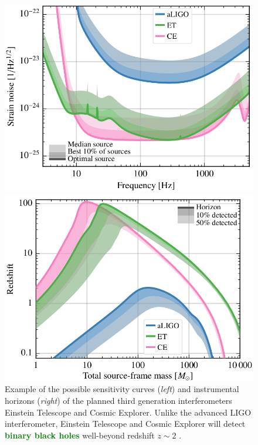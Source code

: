 \documentclass[a4paper,titlepage]{book}     	%
\newcommand{\erika}[1]{\textcolor{green}{\bf#1}}
\begin{document}
\begin{figure}[h]
	\begin{minipage}{.49\textwidth}
		\centering
		\includegraphics[width=\textwidth]{./images/ETsensitivity.png}
	\end{minipage}
	\hfill
	\begin{minipage}{.49\textwidth}
		\vspace{-2mm}
		\centering
		\includegraphics[width=1.02\textwidth]{./images/EThorizon.png}	
	\end{minipage}
	\caption{Example of the possible sensitivity curves (\emph{left}) and instrumental horizons (\emph{right}) of the planned third generation interferometers Einstein Telescope and Cosmic Explorer. Unlike the advanced LIGO interferometer, Einstein Telescope and Cosmic Explorer will detect \erika{binary black holes} well-beyond redshift $z \sim 2$ \cite{EThorizonsensitivity}.}\label{fig:ETsensitivity}
\end{figure}
\end{document}
